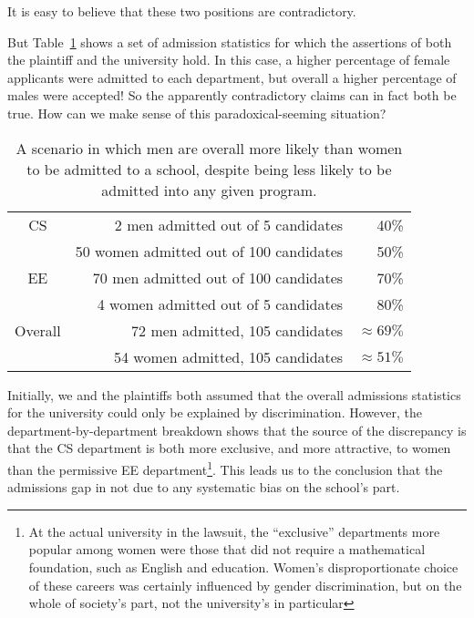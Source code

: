 It is easy to believe that these two positions are contradictory.
\iffalse
In fact, this situation is an instance of what is known as
\term{Simpson's Paradox}.
\fi
But Table~\ref{fig:15D3} shows a set of admission statistics for which
the assertions of both the plaintiff and the university hold.  In this
case, a higher percentage of female applicants were admitted to each
department, but overall a higher percentage of males were accepted!
So the apparently contradictory claims can in fact both be true.  How
can we make sense of this paradoxical-seeming situation?

\begin{table}

\begin{tabular}{crr}
CS & 2 men admitted out of 5 candidates      &   40\% \\
   & 50 women admitted out of 100 candidates     &  50\% \\
EE & 70 men admitted out of 100 candidates   &  70\% \\
   & 4 women admitted out of 5 candidates         & 80\% \\
\hline
Overall & 72 men admitted, 105 candidates & $\approx 69\%$ \\
        & 54 women admitted, 105 candidates   & $\approx 51\%$
\end{tabular}

\caption{A scenario in which men are overall more likely than women to
  be admitted to a school, despite being less likely to be admitted
  into any given program.}

\label{fig:15D3}

\end{table}

Initially, we and the plaintiffs both assumed that the overall
admissions statistics for the university could only be explained by
discrimination.  However, the department-by-department breakdown shows
that the source of the discrepancy is that the CS department is both
more exclusive, and more attractive, to women than the permissive EE
department\footnote{At the actual university in the lawsuit, the
  ``exclusive'' departments more popular among women were those that
  did not require a mathematical foundation, such as English and
  education.  Women's disproportionate choice of these careers was
  certainly influenced by gender discrimination, but on the whole of
  society's part, not the university's in particular}.  This leads us
to the conclusion that the admissions gap in not due to any systematic
bias on the school's part.

